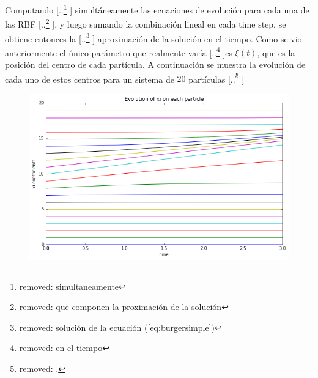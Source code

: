 \documentclass[spanish]{article} %
\providecommand{\DIFaddtex}[1]{{\protect\color{blue} \sf #1}} %
\providecommand{\DIFdeltex}[1]{{\protect\color{red} [..\footnote{removed: #1} ]}} %
\providecommand{\DIFaddbegin}{} %
\providecommand{\DIFaddend}{} %
\providecommand{\DIFdelbegin}{} %
\providecommand{\DIFdelend}{} %
\providecommand{\DIFaddbeginFL}{} %
\providecommand{\DIFaddendFL}{} %
\providecommand{\DIFdelendFL}{} %
\providecommand{\DIFadd}[1]{\texorpdfstring{\DIFaddtex{#1}}{#1}} %
\providecommand{\DIFdel}[1]{\texorpdfstring{\DIFdeltex{#1}}{}} %
\begin{document}
    Computando \DIFdelbegin \DIFdel{simultaneamente }\DIFdelend \DIFaddbegin \DIFadd{simultáneamente }\DIFaddend las ecuaciones de evolución para cada una de las RBF\DIFdelbegin \DIFdel{que componen la proximación de la solución}\DIFdelend , y luego sumando la combinación lineal en cada time step, se obtiene entonces la \DIFdelbegin \DIFdel{solución de la ecuación (\ref{eq:burgersimple}) }\DIFdelend \DIFaddbegin \DIFadd{aproximación de la solución }\DIFaddend en el tiempo. Como se vio anteriormente el único parámetro que \DIFaddbegin \DIFadd{realmente }\DIFaddend varía \DIFdelbegin \DIFdel{en el tiempo }\DIFdelend es $\xi(t)$, que es la posición del centro de cada partícula. A continuación se muestra la evolución de cada uno de estos centros para un sistema de $20$ partículas
    \DIFdelbegin \DIFdel{.
    }%
\DIFdelendFL \DIFaddbeginFL \begin{figure}[H]
      \DIFaddendFL \centering
      \includegraphics[scale=0.5]{xis.png}
    \end{figure}
\end{document}
